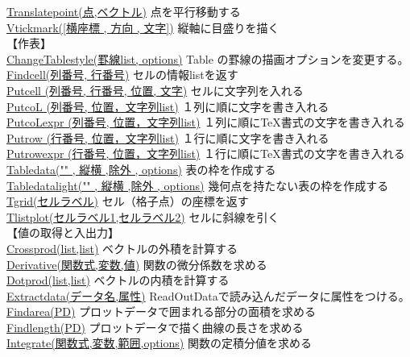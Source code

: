\documentclass[papersize,a4paper,12pt,uplatex]{jsarticle}
\begin{document}
\begin{tabbing}
\hyperlink{translatepoint}{Translatepoint(点,ベクトル)}  \>点を平行移動する\\
\hyperlink{vtickmark}{Vtickmark([横座標 , 方向 , 文字])}    \>縦軸に目盛りを描く\\
【作表】\\
\hyperlink{changetablestyle}{ChangeTablestyle(罫線list, options)}  \>Table の罫線の描画オプションを変更する。\\
\hyperlink{findcell}{Findcell(列番号, 行番号)}  \>セルの情報listを返す\\
\hyperlink{putcell}{Putcell (列番号, 行番号, 位置, 文字)}   \>セルに文字列を入れる\\
\hyperlink{putcol}{PutcoL (列番号, 位置，文字列list)}   \>１列に順に文字を書き入れる\\
\hyperlink{putcolexpr}{PutcoLexpr (列番号, 位置，文字列list)}  \>１列に順に\TeX 書式の文字を書き入れる\\
\hyperlink{putrow}{Putrow (行番号, 位置，文字列list)}   \>１行に順に文字を書き入れる\\
\hyperlink{putrowexpr}{Putrowexpr (行番号, 位置，文字列list)} \>１行に順に\TeX 書式の文字を書き入れる\\
\hyperlink{tabledata}{Tabledata("" , 縦横 ,除外 , options)}  \>表の枠を作成する\\
\hyperlink{tabledatalight}{Tabledatalight("" , 縦横 ,除外 , options)}  \>幾何点を持たない表の枠を作成する\\
\hyperlink{tgrid}{Tgrid(セルラベル)} \>セル（格子点）の座標を返す\\
\hyperlink{tlistplot}{Tlistplot(セルラベル1,セルラベル2)} \>セルに斜線を引く\\
\vspace{\baselineskip}
【値の取得と入出力】\\
\hyperlink{crossprod}{Crossprod(list,list)}  \>ベクトルの外積を計算する\\
\hyperlink{derivative}{Derivative(関数式,変数,値)}  \>関数の微分係数を求める\\
\hyperlink{dotprod}{Dotprod(list,list)}  \>ベクトルの内積を計算する\\
\hyperlink{extractdata}{Extractdata(データ名,属性)}    \>ReadOutDataで読み込んだデータに属性をつける。\\
\hyperlink{findarea}{Findarea(PD)}  \>プロットデータで囲まれる部分の面積を求める\\
\hyperlink{findlength}{Findlength(PD)}  \>プロットデータで描く曲線の長さを求める\\
\hyperlink{integrate}{Integrate(関数式,変数,範囲,options)}   \>関数の定積分値を求める\\

\end{tabbing}
\end{document}
